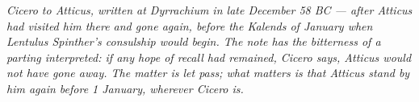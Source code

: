 
\textit{Cicero to Atticus, written at Dyrrachium in late
December 58 BC --- after Atticus had visited him there and
gone again, before the Kalends of January when Lentulus
Spinther's consulship would begin. The note has the bitterness
of a parting interpreted: if any hope of recall had remained,
Cicero says, Atticus would not have gone away. The matter is
let pass; what matters is that Atticus stand by him again
before 1 January, wherever Cicero is.}
